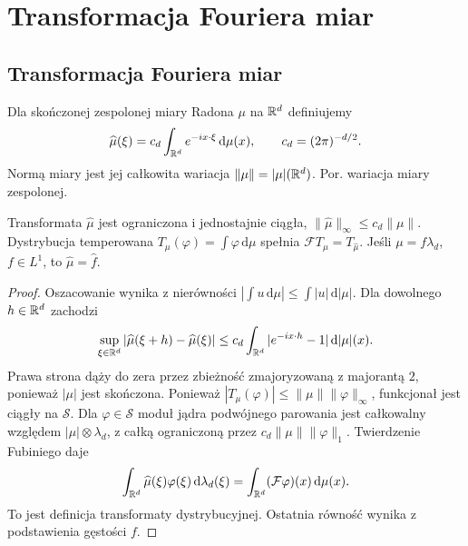 \section{Transformacja Fouriera miar}
\providecommand{\atlasref}[2]{#2}

\subsection{Transformacja Fouriera miar}

\begin{definicja}
\label{def:dt-fourier-measure}
Dla skończonej zespolonej miary Radona $\mu$ na $\mathbb R^d$
definiujemy
\[
 \widehat\mu(\xi)=c_d\int_{\mathbb R^d}e^{-ix\cdot\xi}
 \,\mathrm d\mu(x),\qquad c_d=(2\pi)^{-d/2}.
\]
Normą miary jest jej całkowita wariacja
$\|\mu\|=|\mu|(\mathbb R^d)$.
Por. \atlasref{ME-16::thm:complex-variation-16}{wariacja miary zespolonej}.
\end{definicja}

\begin{twierdzenie}
\label{thm:dt-fourier-measure-cont}
Transformata $\widehat\mu$ jest ograniczona i jednostajnie
ciągła, $\|\widehat\mu\|_\infty\le c_d\|\mu\|$.
Dystrybucja temperowana
$T_\mu(\varphi)=\int\varphi\,\mathrm d\mu$
spełnia $\mathcal FT_\mu=T_{\widehat\mu}$.
Jeśli $\mu=f\lambda_d$, $f\in L^1$, to $\widehat\mu=\widehat f$.
\end{twierdzenie}
\begin{proof}
Oszacowanie wynika z nierówności
$|\int u\,\mathrm d\mu|\le\int|u|\,\mathrm d|\mu|$.
Dla dowolnego $h\in\mathbb R^d$ zachodzi
\[
 \sup_{\xi\in\mathbb R^d}|\widehat\mu(\xi+h)-\widehat\mu(\xi)|
 \le c_d\int_{\mathbb R^d}|e^{-ix\cdot h}-1|\,\mathrm d|\mu|(x).
\]
Prawa strona dąży do zera przez zbieżność zmajoryzowaną
z majorantą $2$, ponieważ $|\mu|$ jest skończona.
Ponieważ $|T_\mu(\varphi)|\le\|\mu\|\|\varphi\|_\infty$,
funkcjonał jest ciągły na $\mathcal S$.
Dla $\varphi\in\mathcal S$ moduł jądra podwójnego
parowania jest całkowalny względem
$|\mu|\otimes\lambda_d$, z całką ograniczoną przez
$c_d\|\mu\|\|\varphi\|_1$. Twierdzenie Fubiniego daje
\[
 \int_{\mathbb R^d}\widehat\mu(\xi)\varphi(\xi)\,\mathrm d\lambda_d(\xi)
 =\int_{\mathbb R^d}(\mathcal F\varphi)(x)\,\mathrm d\mu(x).
\]
To jest definicja transformaty dystrybucyjnej.
Ostatnia równość wynika z podstawienia gęstości $f$.
\end{proof}

